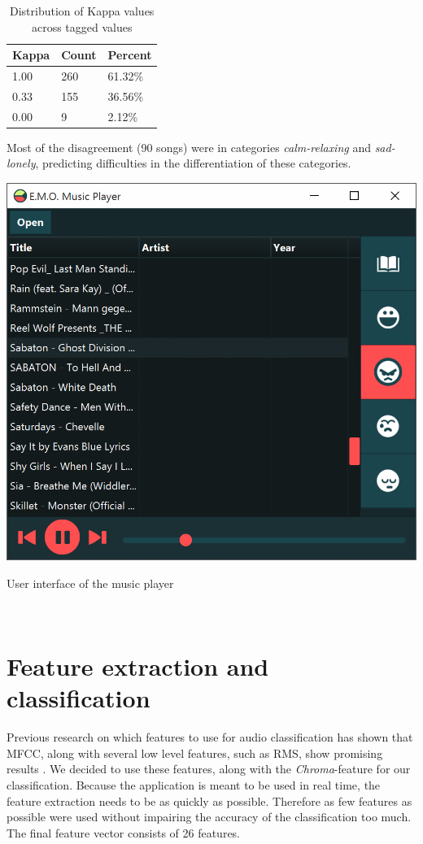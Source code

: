 \documentclass{sigchi-ext}
\begin{document}
\begin{table}
  \centering
  \label{fig:kappa-distribution}
  \begin{tabular}{@{}lll@{}}
    Kappa & Count & Percent \\ \midrule
    1.00 & 260 & 61.32\% \\
    0.33 & 155 & 36.56\% \\
    0.00 & 9 	 & 2.12\%
  \end{tabular}
  \caption{Distribution of Kappa values across tagged values}
\end{table}

Most of the disagreement (90 songs) were in categories \textit{calm-relaxing} and \textit{sad-lonely}, predicting difficulties in the differentiation of these categories.\\

\begin{marginfigure}[0pc]
  \begin{minipage}{\marginparwidth}
    \centering
    \includegraphics[width=1.0\marginparwidth]{images/screenshot.png}
  	\caption{User interface of the music player}~\label{fig:screenshot}
  \end{minipage}
\end{marginfigure}

\section{Feature extraction and classification}\label{sec:feature-extraction}
Previous research on which features to use for audio classification has shown that MFCC, along with several low level features, such as RMS, show promising results \cite{Trohidis2011,Kim2010}. We decided to use these features, along with the \textit{Chroma}-feature for our classification. Because the application is meant to be used in real time, the feature extraction needs to be as quickly as possible. Therefore as few features as possible were used without impairing the accuracy of the classification too much. The final feature vector consists of 26 features.
\end{document}
